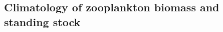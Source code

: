 \documentclass[authoryear,review,11pt]{elsarticle}
\newcommand{\chla}{chl-{\emph{a}}}
\begin{document}
%

\subsection{Climatology of zooplankton biomass and standing stock}
\label{sec:seasonal.climatology}
\end{document}
